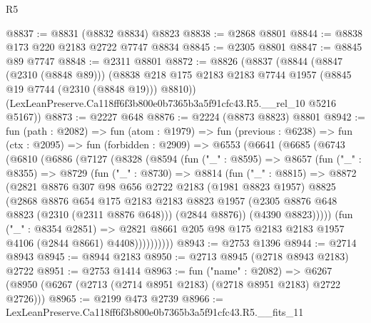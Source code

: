 \begin{lexlean}{R5}
\begin{coremodule}
@8837 := @8831 (@8832 @8834) @8823
@8838 := @2868 @8801
@8844 := @8838 @173 @220 @2183 @2722 @7747 @8834
@8845 := @2305 @8801
@8847 := @8845 @89 @7747
@8848 := @2311 @8801
@8872 := @8826
    (@8837
      (@8844
        (@8847 (@2310 (@8848 @89)))
        (@8838 @218 @175 @2183 @2183 @7744 @1957 (@8845 @19 @7744 (@2310 (@8848 @19))) @8810))
      (LexLeanPreserve.Ca118ff6f3b800e0b7365b3a5f91cfc43.R5.__rel_10 @5216 @5167))
@8873 := @2227 @648
@8876 := @2224 (@8873 @8823) @8801
@8942 := fun (path : @2082) =>
  fun (atom : @1979) =>
  fun (previous : @6238) =>
  fun (ctx : @2095) =>
  fun (forbidden : @2909) =>
  @6553
    (@6641
      (@6685
        (@6743
          (@6810
            (@6886
              (@7127
                (@8328
                  (@8594
                    (fun ("_" : @8595) =>
                    @8657
                      (fun ("_" : @8355) =>
                      @8729
                        (fun ("_" : @8730) =>
                        @8814
                          (fun ("_" : @8815) =>
                          @8872
                            (@2821
                              @8876
                              @307
                              @98
                              @656
                              @2722
                              @2183
                              (@1981 @8823 @1957)
                              @8825
                              (@2868
                                @8876
                                @654
                                @175
                                @2183
                                @2183
                                @8823
                                @1957
                                (@2305 @8876 @648 @8823 (@2310 (@2311 @8876 @648)))
                                (@2844 @8876))
                              (@4390 @8823)))))
                      (fun ("_" : @8354 @2851) =>
                      @2821
                        @8661
                        @205
                        @98
                        @175
                        @2183
                        @2183
                        @1957
                        @4106
                        (@2844 @8661)
                        @4408))))))))))
@8943 := @2753 @1396
@8944 := @2714 @8943
@8945 := @8944 @2183
@8950 := @2713 @8945 (@2718 @8943 @2183) @2722
@8951 := @2753 @1414
@8963 := fun ("name" : @2082) =>
  @6267 (@8950 (@6267 (@2713 (@2714 @8951 @2183) (@2718 @8951 @2183) @2722 @2726)))
@8965 := @2199 @473 @2739
@8966 := LexLeanPreserve.Ca118ff6f3b800e0b7365b3a5f91cfc43.R5.__fits_11

\end{coremodule}
\end{lexlean}
